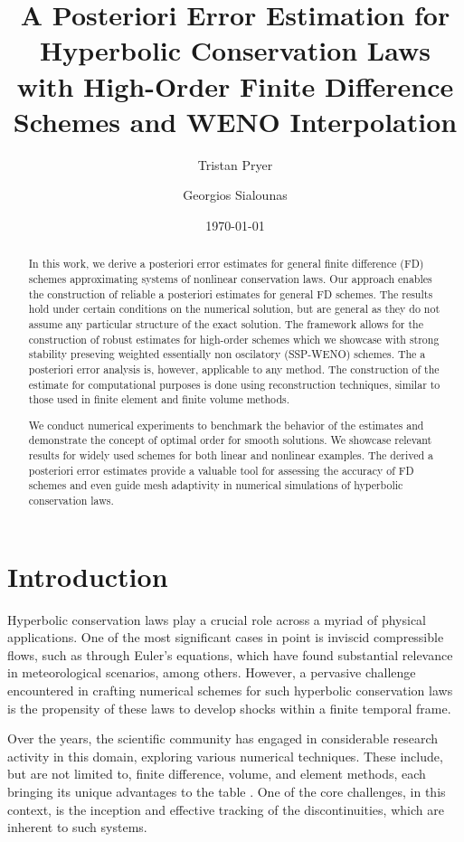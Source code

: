 \documentclass[final]{amsart}
\author{
  Tristan Pryer
}
\author{
  Georgios Sialounas
}
\title{ A Posteriori Error Estimation for Hyperbolic Conservation Laws
  with High-Order Finite Difference Schemes and WENO Interpolation
}
\date{\today}
\numberwithin{equation}{section}
\begin{document}
\maketitle
\begin{abstract}
  In this work, we derive a posteriori error estimates for general
  finite difference (FD) schemes approximating systems of nonlinear
  conservation laws. Our approach enables the construction of reliable
  a posteriori estimates for general FD schemes. The results hold
  under certain conditions on the numerical solution, but are general
  as they do not assume any particular structure of the exact
  solution. The framework allows for the construction of robust
  estimates for high-order schemes which we showcase with strong
  stability preseving weighted essentially non oscilatory (SSP-WENO)
  schemes. The a posteriori error analysis is, however, applicable to
  any method. The construction of the estimate for computational
  purposes is done using reconstruction techniques, similar to those
  used in finite element and finite volume methods.

  We conduct numerical experiments to benchmark the behavior of the
  estimates and demonstrate the concept of optimal order for smooth
  solutions. We showcase relevant results for widely used schemes for
  both linear and nonlinear examples. The derived a posteriori error
  estimates provide a valuable tool for assessing the accuracy of FD
  schemes and even guide mesh adaptivity in numerical simulations of
  hyperbolic conservation laws.
\end{abstract}

\section{Introduction}
\label{sec:introduction}

Hyperbolic conservation laws play a crucial role across a myriad of
physical applications. One of the most significant cases in point is
inviscid compressible flows, such as through Euler's equations, which
have found substantial relevance in meteorological scenarios, among
others. However, a pervasive challenge encountered in crafting
numerical schemes for such hyperbolic conservation laws is the
propensity of these laws to develop shocks within a finite temporal
frame.

Over the years, the scientific community has engaged in considerable
research activity in this domain, exploring various numerical
techniques. These include, but are not limited to, finite difference,
volume, and element methods, each bringing its unique advantages to
the table
\cite{cockburn1995convergence,kroner1994convergence,leveque2002finite}. One
of the core challenges, in this context, is the inception and
effective tracking of the discontinuities, which are inherent to such
systems.
\end{document}
